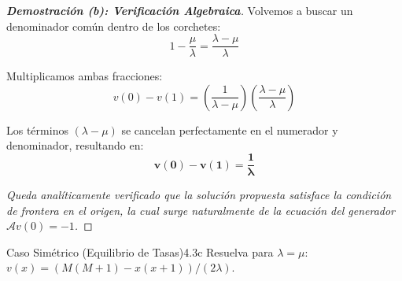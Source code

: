 \documentclass[10pt,a4paper]{article}
\begin{document}
\begin{proof}[\textbf{Demostración (b): Verificación Algebraica}]
    Volvemos a buscar un denominador común dentro de los corchetes:
    \[ 1 - \frac{\mu}{\lambda} = \frac{\lambda - \mu}{\lambda} \]
    
    Multiplicamos ambas fracciones:
    \[ v(0) - v(1) = \left( \frac{1}{\lambda-\mu} \right) \left( \frac{\lambda-\mu}{\lambda} \right) \]
    
    Los términos $(\lambda-\mu)$ se cancelan perfectamente en el numerador y denominador, resultando en:
    \[ \mathbf{v(0) - v(1) = \frac{1}{\lambda}} \]
    
    \textit{Queda analíticamente verificado que la solución propuesta satisface la condición de frontera en el origen, la cual surge naturalmente de la ecuación del generador $\mathcal{A}v(0) = -1$.}
\end{proof}

\newpage


\begin{ejercicio}{Caso Simétrico (Equilibrio de Tasas)}{4.3c}
    Resuelva para $\lambda = \mu$: $v(x) = (M(M + 1) - x(x + 1))/(2\lambda)$.
\end{ejercicio}
\end{document}
